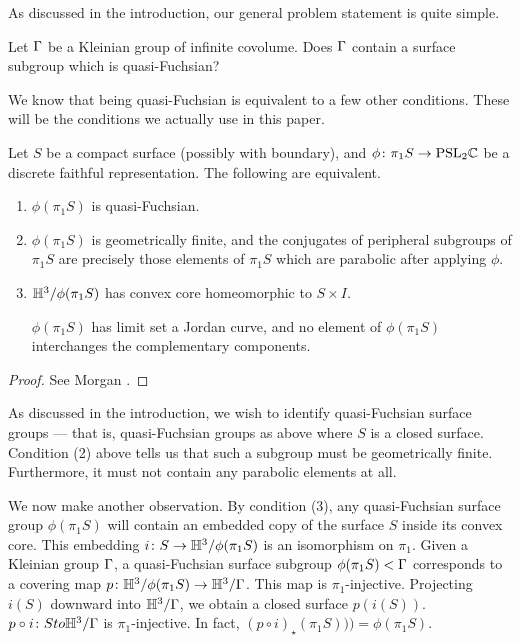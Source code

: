 As discussed in the introduction, our general problem statement is quite
simple.

\begin{prob}

Let $\Gamma$ be a Kleinian group of infinite covolume. Does $\Gamma$ contain
a surface subgroup which is quasi-Fuchsian?

\end{prob}

We know that being quasi-Fuchsian is equivalent to a few other conditions.
These will be the conditions we actually use in this paper.

\begin{prop}

Let $S$ be a compact surface (possibly with boundary), and $\phi \colon \pi_1S
\to \mathrm{PSL}_2\mathbb{C}$ be a discrete faithful representation. The following are
equivalent.

\begin{enumerate}

\item $\phi(\pi_1S)$ is quasi-Fuchsian.

\item $\phi(\pi_1S)$ is geometrically finite, and the conjugates of peripheral
subgroups of $\pi_1S$ are precisely those elements of $\pi_1S$ which are
parabolic after applying $\phi$.

\item $\mathbb{H}^3/\phi(\pi_1S)$ has convex core homeomorphic to $S \times I$.

$\phi(\pi_1S)$ has limit set a Jordan curve, and no element of $\phi(\pi_1S)$
interchanges the complementary components.

\end{enumerate}

\end{prop}

\begin{proof}

See Morgan \cite[Proposition 9.2]{Mo}.%

\end{proof}

As discussed in the introduction, we wish to identify quasi-Fuchsian surface
groups --- that is, quasi-Fuchsian groups as above where $S$ is a closed
surface.  Condition (2) above tells us that such a subgroup must be
geometrically finite.  Furthermore, it must not contain any parabolic elements
at all.

We now make another observation. By condition (3), any quasi-Fuchsian surface
group $\phi(\pi_1S)$ will contain an embedded copy of the surface $S$ inside
its convex core.  This embedding $i \colon S \to \mathbb{H}^3/\phi(\pi_1S)$ is an
isomorphism on $\pi_1$.  Given a Kleinian group $\Gamma$, a quasi-Fuchsian surface
subgroup $\phi(\pi_1S) < \Gamma$ corresponds to a covering map $p \colon
\mathbb{H}^3/\phi(\pi_1S) \to \mathbb{H}^3/\Gamma$. This map is $\pi_1$-injective.  Projecting
$i(S)$ downward into $\mathbb{H}^3/\Gamma$, we obtain a closed surface $p(i(S))$. $p
\circ i \colon S to \mathbb{H}^3/\Gamma$ is $\pi_1$-injective. In fact, $(p \circ
i)_\star(\pi_1S))) = \phi(\pi_1S)$.

